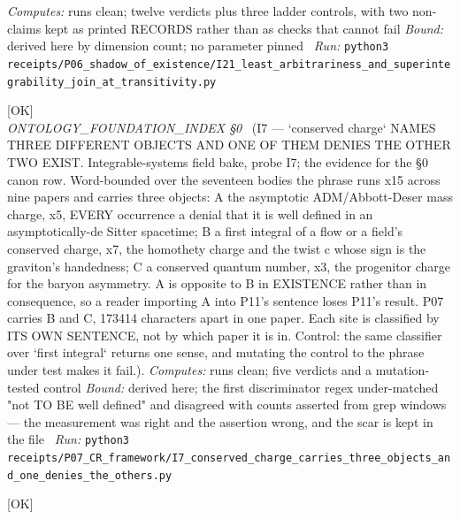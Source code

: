 \begin{description}
\emph{Computes:} runs clean; twelve verdicts plus three ladder controls, with two non-claims kept as printed RECORDS rather than as checks that cannot fail
 \emph{Bound:} derived here by dimension count; no parameter pinned
\ \emph{Run:} \texttt{python3 receipts/P06\_shadow\_of\_existence/I21\_least\_arbitrariness\_and\_superintegrability\_join\_at\_transitivity.py}
\item[\label{rcpt:I7_conserved_charge_carries_three_objects_and_one_denies_the_others}\texttt{I7\_conserved\_charge\_carries\_three\_objects\_and\_one\_denies\_the\_others}]\hfill\textsf{[OK]}\\
\textit{ONTOLOGY\_FOUNDATION\_INDEX \S{}0} \ (I7 --- `conserved charge` NAMES THREE DIFFERENT OBJECTS AND ONE OF THEM DENIES THE OTHER TWO EXIST. Integrable-systems field bake, probe I7; the evidence for the \S{}0 canon row. Word-bounded over the seventeen bodies the phrase runs x15 across nine papers and carries three objects: A the asymptotic ADM/Abbott-Deser mass charge, x5, EVERY occurrence a denial that it is well defined in an asymptotically-de Sitter spacetime; B a first integral of a flow or a field's conserved charge, x7, the homothety charge and the twist c whose sign is the graviton's handedness; C a conserved quantum number, x3, the progenitor charge for the baryon asymmetry. A is opposite to B in EXISTENCE rather than in consequence, so a reader importing A into P11's sentence loses P11's result. P07 carries B and C, 173414 characters apart in one paper. Each site is classified by ITS OWN SENTENCE, not by which paper it is in. Control: the same classifier over `first integral` returns one sense, and mutating the control to the phrase under test makes it fail.). 
\emph{Computes:} runs clean; five verdicts and a mutation-tested control
 \emph{Bound:} derived here; the first discriminator regex under-matched "not TO BE well defined" and disagreed with counts asserted from grep windows --- the measurement was right and the assertion wrong, and the scar is kept in the file
\ \emph{Run:} \texttt{python3 receipts/P07\_CR\_framework/I7\_conserved\_charge\_carries\_three\_objects\_and\_one\_denies\_the\_others.py}
\item[\label{rcpt:D1_the_traced_half_is_the_theorem_and_the_computed_half_is_not}\texttt{D1\_the\_traced\_half\_is\_the\_theorem\_and\_the\_computed\_half\_is\_not}]\hfill\textsf{[OK]}\\

\end{description}
